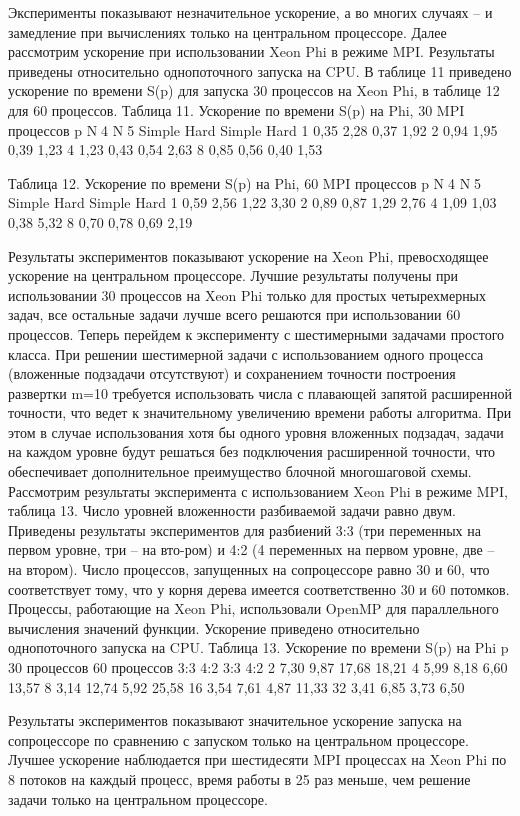 Эксперименты показывают незначительное ускорение, а во многих случаях – и замедление при вычислениях только на центральном процессоре.
Далее рассмотрим ускорение при использовании Xeon Phi в режиме MPI. Результаты приведены относительно однопоточного запуска на CPU. В таблице 11 приведено ускорение по времени S(p) для запуска 30 процессов на Xeon Phi, в таблице 12 для 60 процессов.
Таблица 11. Ускорение по времени S(p) на Phi, 30 MPI процессов
p	N4	N5
	Simple	Hard	Simple	Hard
1	0,35	2,28	0,37	1,92
2	0,94	1,95	0,39	1,23
4	1,23	0,43	0,54	2,63
8	0,85	0,56	0,40	1,53




Таблица 12. Ускорение по времени S(p) на Phi, 60 MPI процессов
p	N4	N5
	Simple	Hard	Simple	Hard
1	0,59	2,56	1,22	3,30
2	0,89	0,87	1,29	2,76
4	1,09	1,03	0,38	5,32
8	0,70	0,78	0,69	2,19

Результаты экспериментов показывают ускорение на Xeon Phi, превосходящее ускорение на центральном процессоре. Лучшие результаты получены при использовании 30 процессов на Xeon Phi только для простых четырехмерных задач, все остальные задачи лучше всего решаются при использовании 60 процессов.
Теперь перейдем к эксперименту с шестимерными задачами простого класса. При решении шестимерной задачи с использованием одного процесса (вложенные подзадачи отсутствуют) и сохранением точности построения развертки m=10 требуется использовать числа с плавающей запятой расширенной точности, что ведет к значительному увеличению времени работы алгоритма. При этом в случае использования хотя бы одного уровня вложенных подзадач, задачи на каждом уровне будут решаться без подключения расширенной точности, что обеспечивает дополнительное преимущество блочной многошаговой схемы.
Рассмотрим результаты эксперимента с использованием Xeon Phi в режиме MPI, таблица 13. Число уровней вложенности разбиваемой задачи равно двум. Приведены результаты экспериментов для разбиений 3:3 (три переменных на первом уровне, три – на вто-ром) и 4:2 (4 переменных на первом уровне, две – на втором). Число процессов, запущенных на сопроцессоре равно 30 и 60, что соответствует тому, что у корня дерева имеется соответственно 30 и 60 потомков. Процессы, работающие на Xeon Phi, использовали OpenMP для параллельного вычисления значений функции. Ускорение приведено относительно однопоточного запуска на CPU.
Таблица 13. Ускорение по времени S(p) на Phi
p	30 процессов	60 процессов
	3:3	4:2	3:3	4:2
2	7,30	9,87	17,68	18,21
4	5,99	8,18	6,60	13,57
8	3,14	12,74	5,92	25,58
16	3,54	7,61	4,87	11,33
32	3,41	6,85	3,73	6,50

Результаты экспериментов показывают значительное ускорение запуска на сопроцессоре по сравнению с запуском только на центральном процессоре. Лучшее ускорение наблюдается при шестидесяти MPI процессах на Xeon Phi по 8 потоков на каждый процесс, время работы в 25 раз меньше, чем решение задачи только на центральном процессоре.
